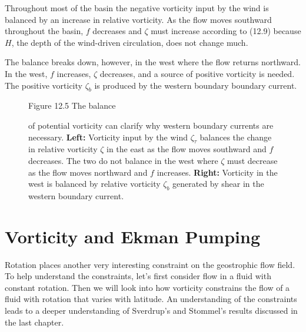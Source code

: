 Throughout most of the basin the negative vorticity input by the wind is balanced by an increase in relative vorticity. As the flow moves southward throughout the basin, $f$ decreases and $\zeta$ must increase according to (12.9) because $H$, the depth of the wind-driven circulation, does not change much. 

The balance breaks down, however, in the west where the flow returns northward. In the west, $f$ increases, $\zeta$ decreases, and a source of positive vorticity is needed. The positive vorticity $\zeta_{b}$ is produced by the western boundary boundary current. 

\begin{figure}[t!]
\footnotesize
Figure 12.5 The balance  \rule{0pt}{4ex}of potential vorticity
can clarify why western boundary currents are necessary.
\textbf{Left:} Vorticity input by the wind $\zeta_{\tau}$ balances the
change in relative vorticity $\zeta$ in the east as the
flow moves southward and $f$ decreases. The two do not balance in the west
where $\zeta$ must decrease as the flow moves northward and $f$ increases.
\textbf{Right:} Vorticity in the west is balanced by relative vorticity
$\zeta_b$ generated by shear in the western boundary current.
\label{fig:westbdycurrent}
\vfill
\vspace{-4ex}
\end{figure}

\section{Vorticity and Ekman Pumping}
Rotation places another very interesting constraint on the
geostrophic flow field. To help understand
the constraints, let's first consider flow in a fluid with constant rotation. Then we will look
into how vorticity constrains the flow of a fluid with rotation that varies with latitude. An
understanding of the constraints leads to a deeper understanding of Sverdrup's and Stommel's
results discussed in the last chapter.

